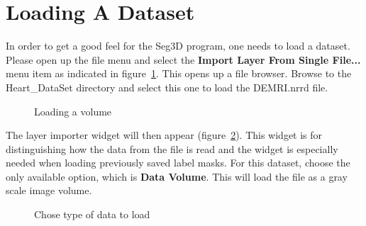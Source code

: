\documentclass[fleqn,11pt,openany]{book}
\begin{document}
\section{Loading A Dataset}

In order to get a good feel for the Seg3D program, one needs to load a dataset. Please open up the file menu and select the {\bf Import Layer From Single File...} menu item as indicated in figure~\ref{fig:LoadVolume}. This opens up a file browser. Browse to the Heart\_DataSet directory and select this one to load the DEMRI.nrrd file.


\begin{figure}
\caption{Loading a volume}\label{fig:LoadVolume}
\end{figure}

The layer importer widget will then appear (figure~\ref{fig:LoadVolume_2}).  This widget is for distinguishing how the data from the file is read and the widget is especially needed when loading previously saved label masks.  For this dataset, choose the only available option, which is \textbf {Data Volume}.  This will load the file as a gray scale image volume.  

\begin{figure}
\caption{Chose type of data to load}\label{fig:LoadVolume_2}
\end{figure}
\end{document}
